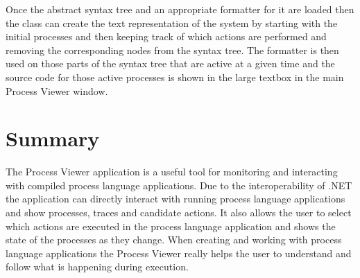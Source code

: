 	Once the abstract syntax tree and an appropriate formatter for it are loaded
	then the  class can create the text 
	representation of the system by starting with the initial processes and 
	then keeping track of which actions are performed and removing the 
	corresponding nodes from the syntax tree. The formatter is then used on those
	parts of the syntax tree that are active at a given time and the source
	code for those active processes is shown in the large textbox in the main 
	Process Viewer window.

\section{Summary}

	The Process Viewer application is a useful tool for monitoring and 
	interacting with compiled process language applications. Due to the 
	interoperability of .NET the application can directly interact with running 
	process language applications and show processes, traces and candidate 
	actions. It also allows the user to select which actions are executed in the 
	process language application and shows the state of the processes as they 
	change. When creating and working with process language applications the 
	Process Viewer really helps the user to understand and follow what is 
	happening during execution.